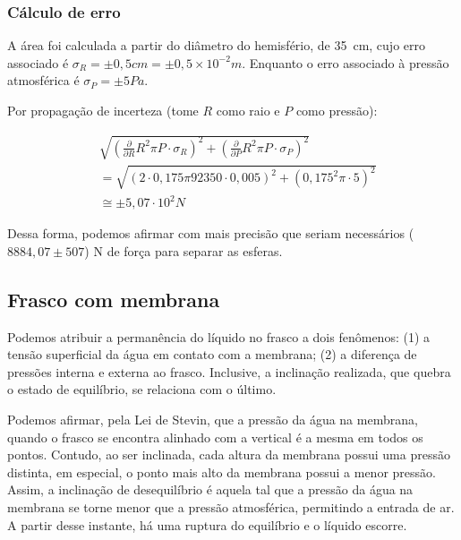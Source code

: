 \subsubsection{Cálculo de erro}
A área foi calculada a partir do diâmetro do hemisfério, de \qty{35}{cm},
cujo erro associado é \(\sigma_R = \pm 0,5 \unit{cm} =
\pm 0,5 \times 10^{-2} \unit{m} \).
Enquanto o erro associado à pressão atmosférica é \(\sigma_P = \pm 5
\unit{Pa}\).

Por propagação de incerteza (tome \(R\) como raio e \(P\) como pressão):

\begin{align*}
&\sqrt{\left( \frac{\partial }{\partial R} R^{2}\pi P \cdot \sigma_R \right)^{2} + \left( \frac{\partial }{\partial P} R^{2}\pi P \cdot\sigma_P \right)^{2}}\\
&= \sqrt{\left( 2 \cdot 0,175 \pi 92350 \cdot 0,005 \right)^{2} + \left(0,175^{2}\pi \cdot 5 \right)^{2}} \\
&\cong  \pm 5,07 \cdot 10^2 \unit{N}
\end{align*}

Dessa forma, podemos afirmar com mais precisão que seriam necessários
(\(8884,07 \pm 507 \)) N de força para separar as esferas.

\subsection{Frasco com membrana}

Podemos atribuir a permanência do líquido no frasco a dois fenômenos: (1) a
tensão superficial da água em contato com a membrana; (2) a diferença de
pressões interna e externa ao frasco. Inclusive, a inclinação realizada, que
quebra o estado de equilíbrio, se relaciona com o último. 

Podemos afirmar, pela Lei de Stevin, que a pressão da água na membrana, quando o
frasco se encontra alinhado com a vertical é a mesma em todos os pontos.
Contudo, ao ser inclinada, cada altura da membrana possui uma pressão distinta,
em especial, o ponto mais alto da membrana possui a menor pressão. Assim, a
inclinação de desequilíbrio é aquela tal que a pressão da água na membrana se
torne menor que a pressão atmosférica, permitindo a entrada de ar. A partir
desse instante, há uma ruptura do equilíbrio e o líquido escorre.
